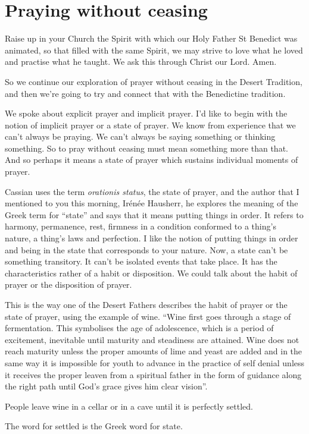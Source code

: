 \chapter{Praying without ceasing}

Raise up in your Church the Spirit with which our Holy Father St Benedict was animated, so that filled with the same Spirit, we may strive to love what he loved and practise what he taught. We ask this through Christ our Lord. Amen.

So we continue our exploration of prayer without ceasing in the Desert Tradition, and then we're going to try and connect that with the Benedictine tradition.

We spoke about explicit prayer and implicit prayer. I'd like to begin with the notion of implicit prayer or a state of prayer. We know from experience that we can't always be praying. We can't always be saying something or thinking something. So to pray without ceasing must mean something more than that. And so perhaps it means a state of prayer which sustains individual moments of prayer.

Cassian uses the term \emph{orationis status}, the state of prayer, and the author that I mentioned to you this morning, Ir\'{e}n\'{e}e Hausherr, he explores the meaning of the Greek term for ``state'' and says that it means putting things in order. It refers to harmony, permanence, rest, firmness in a condition conformed to a thing's nature, a thing's laws and perfection. I like the notion of putting things in order and being in the state that corresponds to your nature. Now, a state can't be something transitory. It can't be isolated events that take place. It has the characteristics rather of a habit or disposition. We could talk about the habit of prayer or the disposition of prayer.

This is the way one of the Desert Fathers describes the habit of prayer or the state of prayer, using the example of wine. ``Wine first goes through a stage of fermentation. This symbolises the age of adolescence, which is a period of excitement, inevitable until maturity and steadiness are attained. Wine does not reach maturity unless the proper amounts of lime and yeast are added and in the same way it is impossible for youth to advance in the practice of self denial unless it receives the proper leaven from a spiritual father in the form of guidance along the right path until God's grace gives him clear vision''.

People leave wine in a cellar or in a cave until it is perfectly settled. 

The word for settled is the Greek word for state.
